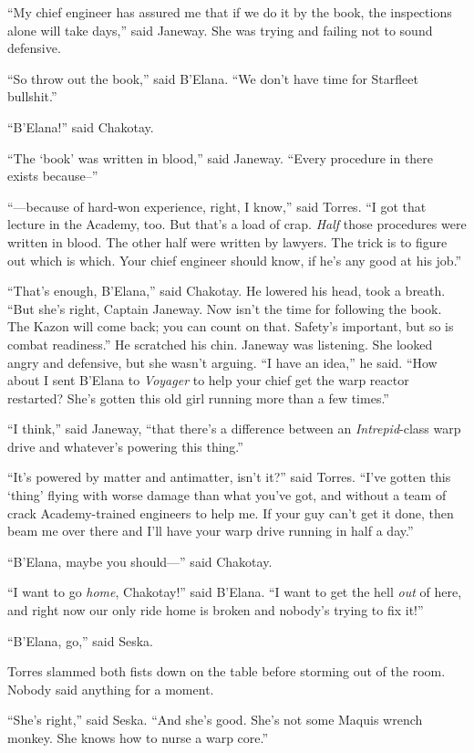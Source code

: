 \documentclass[twoside,letterpaper,12pt]{memoir}
\begin{document}
``My chief engineer has assured me that if we do it by the book, the inspections alone will take days,'' said Janeway. She was trying and failing not to sound defensive.

``So throw out the book,'' said B'Elana. ``We don't have time for Starfleet bullshit.''

``B'Elana!'' said Chakotay.

``The `book' was written in blood,'' said Janeway. ``Every procedure in there exists because\---''

``---because of hard-won experience, right, I know,'' said Torres. ``I got that lecture in the Academy, too. But that's a load of crap. \textit{Half} those procedures were written in blood. The other half were written by lawyers. The trick is to figure out which is which. Your chief engineer should know, if he’s any good at his job.''

``That's enough, B'Elana,'' said Chakotay. He lowered his head, took a breath. ``But she's right, Captain Janeway. Now isn't the time for following the book. The Kazon will come back; you can count on that. Safety's important, but so is combat readiness.'' He scratched his chin. Janeway was listening. She looked angry and defensive, but she wasn't arguing. ``I have an idea,'' he said. ``How about I sent B'Elana to \textit{Voyager} to help your chief get the warp reactor restarted? She's gotten this old girl running more than a few times.''

``I think,'' said Janeway, ``that there's a difference between an \textit{Intrepid}-class warp drive and whatever's powering this thing.''

``It's powered by matter and antimatter, isn't it?'' said Torres. ``I've gotten this `thing' flying with worse damage than what you've got, and without a team of crack Academy-trained engineers to help me. If your guy can't get it done, then beam me over there and I'll have your warp drive running in half a day.''

``B'Elana, maybe you should---'' said Chakotay.

``I want to go \textit{home}, Chakotay!'' said B'Elana. ``I want to get the hell \textit{out} of here, and right now our only ride home is broken and nobody's trying to fix it!''

``B'Elana, go,'' said Seska.

Torres slammed both fists down on the table before storming out of the room. Nobody said anything for a moment.

``She's right,'' said Seska. ``And she's good. She's not some Maquis wrench monkey. She knows how to nurse a warp core.''
\end{document}
